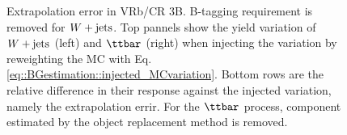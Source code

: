 \begin{figure}[h]
  \centering
 \caption{Extrapolation error in VRb/CR 3B. B-tagging requirement is removed for $W+\mathrm{jets}$. Top pannels show the yield variation of $W+\mathrm{jets}$ (left) and $\ttbar$ (right) when injecting the variation by reweighting the MC with Eq. \ref{eq::BGestimation::injected_MCvariation}. Bottom rows are the relative difference in their response against the injected variation, namely the extrapolation errir. For the $\ttbar$ process, component estimated by the object replacement method is removed.  \label{fig::BGestimation::valid_extp_VRb6J} }
\end{figure}





